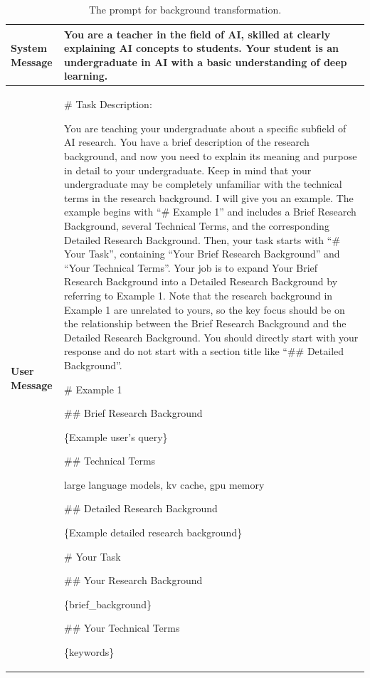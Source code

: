 \documentclass{article}
\theoremstyle{plain}
\theoremstyle{definition}
\theoremstyle{remark}
\begin{document}
\begin{table}[t]
	\centering  %
	\caption{The prompt for background transformation.}  %
	\label{tab:bt}  %
	\begin{tabular}{l | m{}}  
		\toprule  %
            \textbf{System Message} & You are a teacher in the field of AI, skilled at clearly explaining AI concepts to students. Your student is an undergraduate in AI with a basic understanding of deep learning. \\
            \midrule
            \textbf{User Message} & \# Task Description:
            
You are teaching your undergraduate about a specific subfield of AI research. You have a brief description of the research background, and now you need to explain its meaning and purpose in detail to your undergraduate. Keep in mind that your undergraduate may be completely unfamiliar with the technical terms in the research background. I will give you an example. The example begins with ``\# Example 1'' and includes a Brief Research Background, several Technical Terms, and the corresponding Detailed Research Background. Then, your task starts with ``\# Your Task'', containing ``Your Brief Research Background'' and ``Your Technical Terms''. Your job is to expand Your Brief Research Background into a Detailed Research Background by referring to Example 1. Note that the research background in Example 1 are unrelated to yours, so the key focus should be on the relationship between the Brief Research Background and the Detailed Research Background. You should directly start with your response and do not start with a section title like ``\#\# Detailed Background''. 

\# Example 1

\#\# Brief Research Background

\{Example user's query\}

\#\# Technical Terms

large language models, kv cache, gpu memory

\#\# Detailed Research Background

\{Example detailed research background\}

\# Your Task

\#\# Your Research Background

\{brief\_background\}

\#\# Your Technical Terms

\{keywords\}
\\
		\bottomrule
	\end{tabular}
\end{table}
\end{document}
